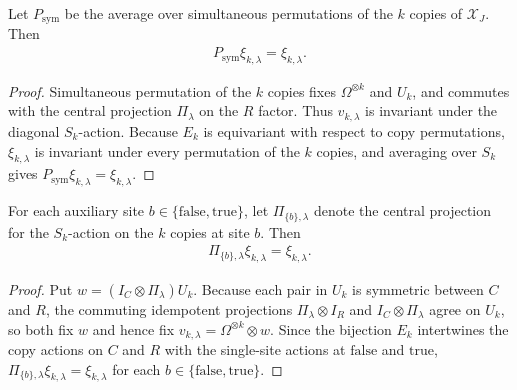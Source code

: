 \begin{lemma}
    \label{thm:al_augmented_prevector_symmetry}
    \leanok
    Let $P_{\mathrm{sym}}$ be the average over simultaneous permutations of the
    $k$ copies of $\mathcal X_J$. Then
    \begin{align*}
        P_{\mathrm{sym}}\xi_{k,\lambda}=\xi_{k,\lambda}.
    \end{align*}
\end{lemma}
\begin{proof}
    \leanok
    Simultaneous permutation of the $k$ copies fixes $\Omega^{\otimes k}$ and $U_k$,
    and commutes with the central projection $\Pi_\lambda$ on the $R$ factor.
    Thus $v_{k,\lambda}$ is invariant under the diagonal $S_k$-action.
    Because $E_k$ is equivariant with respect to copy permutations,
    $\xi_{k,\lambda}$ is invariant under every permutation of the $k$ copies,
    and averaging over $S_k$ gives $P_{\mathrm{sym}}\xi_{k,\lambda}=\xi_{k,\lambda}$.
\end{proof}

\begin{lemma}
    \label{thm:al_augmented_prevector_auxiliary_label}
    \leanok
    For each auxiliary site $b\in\{\mathrm{false},\mathrm{true}\}$, let
    $\Pi_{\{b\},\lambda}$ denote the central projection for the
    $S_k$-action on the $k$ copies at site $b$. Then
    \begin{align*}
        \Pi_{\{b\},\lambda}\xi_{k,\lambda}=\xi_{k,\lambda}.
    \end{align*}
\end{lemma}
\begin{proof}
    \leanok
    Put $w=(I_C\otimes\Pi_\lambda)U_k$.
    Because each pair in $U_k$ is symmetric between $C$ and $R$, the commuting
    idempotent projections $\Pi_\lambda\otimes I_R$ and $I_C\otimes\Pi_\lambda$
    agree on $U_k$, so both fix $w$ and hence fix
    $v_{k,\lambda}=\Omega^{\otimes k}\otimes w$.
    Since the bijection $E_k$ intertwines the copy actions on $C$ and $R$ with
    the single-site actions at $\mathrm{false}$ and $\mathrm{true}$,
    $\Pi_{\{b\},\lambda}\xi_{k,\lambda}=\xi_{k,\lambda}$ for each
    $b\in\{\mathrm{false},\mathrm{true}\}$.
\end{proof}
